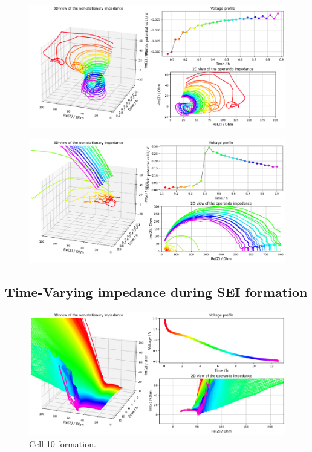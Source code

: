 \begin{figure}[h]
    \centering
    \includegraphics[width=\linewidth]{figures/application3/image13.png}
\end{figure}

\begin{figure}[h]
    \centering
    \includegraphics[width=\linewidth]{figures/application3/image14.png}
\end{figure}

\subsection{Time-Varying impedance during SEI formation}

\begin{figure}[h]
    \centering
    \includegraphics[width=\linewidth]{figures/application3/image15.png}
    \caption{Cell 10 formation.}
    \label{fig:cell10_formation}
\end{figure}

